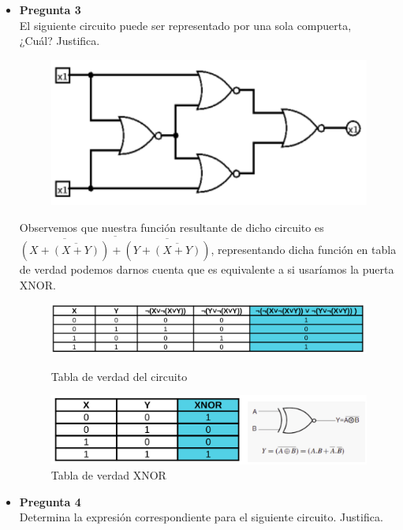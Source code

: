 \documentclass[11pt,letterpaper]{article}
\begin{document}
\begin{itemize}
		
		\item \textbf{Pregunta 3}\\
		
		El siguiente circuito puede ser representado por una sola compuerta,\\
		¿Cuál? Justifica.
		
		\begin{figure}[h]
			\centering
			\includegraphics[scale=0.40]{Pregunta3.png}
		\end{figure}
	
		Observemos que nuestra función resultante de dicho circuito es $\overline{\overline{(X+\overline{(X+Y)})}+\overline{(Y+\overline{(X+Y)})}}$, representando dicha función en tabla de verdad podemos darnos cuenta que es equivalente a si usaríamos la puerta XNOR.
		
		\begin{figure}[h]
			\centering
			\includegraphics[scale=0.35]{EquivXNOR.png}
			\caption{Tabla de verdad del circuito}
			\includegraphics[scale=0.35]{XNOR.png}
			\caption{Tabla de verdad XNOR}
		\end{figure}
		
		\newpage
		\item \textbf{Pregunta 4}\\
		Determina la expresión correspondiente para el siguiente circuito. Justifica.
		

\end{itemize}
\end{document}
